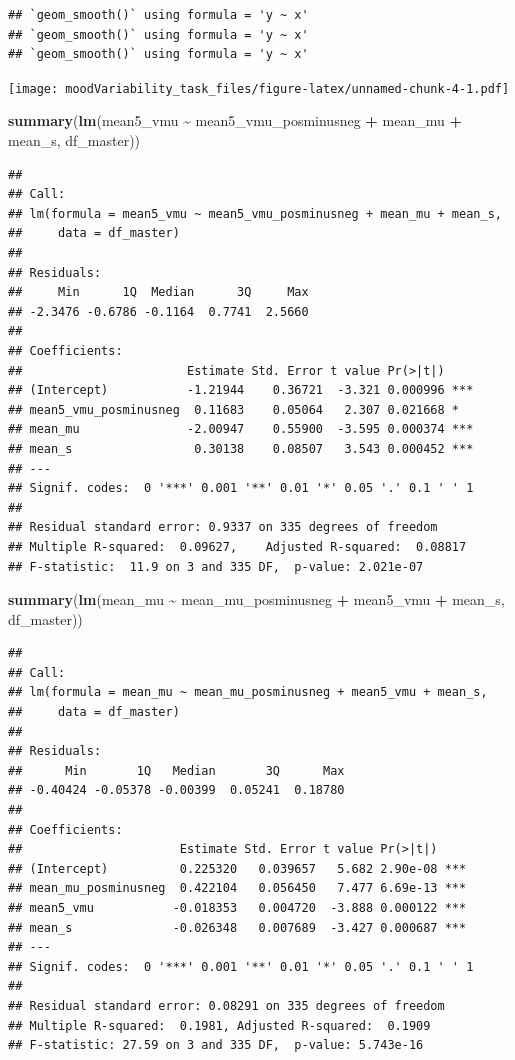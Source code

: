 \documentclass[
]{article}
\newenvironment{Shaded}{\begin{snugshade}}{\end{snugshade}}
\newcommand{\FunctionTok}[1]{\textcolor[rgb]{0.13,0.29,0.53}{\textbf{#1}}}
\newcommand{\NormalTok}[1]{#1}
\newcommand{\SpecialCharTok}[1]{\textcolor[rgb]{0.81,0.36,0.00}{\textbf{#1}}}
\begin{document}
\begin{verbatim}
## `geom_smooth()` using formula = 'y ~ x'
## `geom_smooth()` using formula = 'y ~ x'
## `geom_smooth()` using formula = 'y ~ x'
\end{verbatim}

\texttt{[image: moodVariability\_task\_files/figure-latex/unnamed-chunk-4-1.pdf]}

\begin{Shaded}
\begin{Highlighting}[]
\FunctionTok{summary}\NormalTok{(}\FunctionTok{lm}\NormalTok{(mean5\_vmu }\SpecialCharTok{\textasciitilde{}}\NormalTok{ mean5\_vmu\_posminusneg }\SpecialCharTok{+}\NormalTok{ mean\_mu }\SpecialCharTok{+}\NormalTok{ mean\_s, df\_master))}
\end{Highlighting}
\end{Shaded}

\begin{verbatim}
## 
## Call:
## lm(formula = mean5_vmu ~ mean5_vmu_posminusneg + mean_mu + mean_s, 
##     data = df_master)
## 
## Residuals:
##     Min      1Q  Median      3Q     Max 
## -2.3476 -0.6786 -0.1164  0.7741  2.5660 
## 
## Coefficients:
##                       Estimate Std. Error t value Pr(>|t|)    
## (Intercept)           -1.21944    0.36721  -3.321 0.000996 ***
## mean5_vmu_posminusneg  0.11683    0.05064   2.307 0.021668 *  
## mean_mu               -2.00947    0.55900  -3.595 0.000374 ***
## mean_s                 0.30138    0.08507   3.543 0.000452 ***
## ---
## Signif. codes:  0 '***' 0.001 '**' 0.01 '*' 0.05 '.' 0.1 ' ' 1
## 
## Residual standard error: 0.9337 on 335 degrees of freedom
## Multiple R-squared:  0.09627,    Adjusted R-squared:  0.08817 
## F-statistic:  11.9 on 3 and 335 DF,  p-value: 2.021e-07
\end{verbatim}

\begin{Shaded}
\begin{Highlighting}[]
\FunctionTok{summary}\NormalTok{(}\FunctionTok{lm}\NormalTok{(mean\_mu }\SpecialCharTok{\textasciitilde{}}\NormalTok{ mean\_mu\_posminusneg }\SpecialCharTok{+}\NormalTok{ mean5\_vmu }\SpecialCharTok{+}\NormalTok{ mean\_s, df\_master))}
\end{Highlighting}
\end{Shaded}

\begin{verbatim}
## 
## Call:
## lm(formula = mean_mu ~ mean_mu_posminusneg + mean5_vmu + mean_s, 
##     data = df_master)
## 
## Residuals:
##      Min       1Q   Median       3Q      Max 
## -0.40424 -0.05378 -0.00399  0.05241  0.18780 
## 
## Coefficients:
##                      Estimate Std. Error t value Pr(>|t|)    
## (Intercept)          0.225320   0.039657   5.682 2.90e-08 ***
## mean_mu_posminusneg  0.422104   0.056450   7.477 6.69e-13 ***
## mean5_vmu           -0.018353   0.004720  -3.888 0.000122 ***
## mean_s              -0.026348   0.007689  -3.427 0.000687 ***
## ---
## Signif. codes:  0 '***' 0.001 '**' 0.01 '*' 0.05 '.' 0.1 ' ' 1
## 
## Residual standard error: 0.08291 on 335 degrees of freedom
## Multiple R-squared:  0.1981, Adjusted R-squared:  0.1909 
## F-statistic: 27.59 on 3 and 335 DF,  p-value: 5.743e-16
\end{verbatim}
\end{document}
